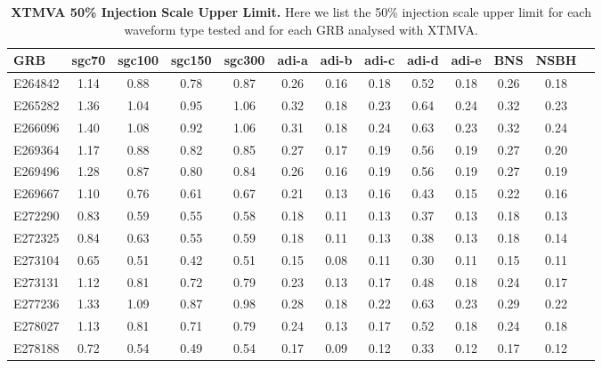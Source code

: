 \documentclass[11pt]{cuthesis}
\begin{document}
\begin{landscape}
\begin{table}
\centering
\begin{tabular}{l c  c  c  c  c  c  c  c c c c c |}
\hline
GRB & sgc70 &	sgc100 &	sgc150 &	sgc300 &	adi-a &	adi-b &	adi-c &	adi-d &	adi-e &	BNS &	NSBH \\
\hline		
E264842 & 1.14 & 0.88 & 0.78 & 0.87 & 0.26 & 0.16 & 0.18 & 0.52 & 0.18 & 0.26 & 0.18 \\                                                                         
E265282 & 1.36 & 1.04 & 0.95 & 1.06 & 0.32 & 0.18 & 0.23 & 0.64 & 0.24 & 0.32 & 0.23 \\									
E266096 & 1.40 & 1.08 & 0.92 & 1.06 & 0.31 & 0.18 & 0.24 & 0.63 & 0.23 & 0.32 & 0.24 \\
E269364 & 1.17 & 0.88 & 0.82 & 0.85 & 0.27 & 0.17 & 0.19 & 0.56 & 0.19 & 0.27 & 0.20 \\
E269496 & 1.28 & 0.87 & 0.80 & 0.84 & 0.26 & 0.16 & 0.19 & 0.56 & 0.19 & 0.27 & 0.19 \\
E269667 & 1.10 & 0.76 & 0.61 & 0.67 & 0.21 & 0.13 & 0.16 & 0.43 & 0.15 & 0.22 & 0.16 \\
E272290 & 0.83 & 0.59 & 0.55 & 0.58 & 0.18 & 0.11 & 0.13 & 0.37 & 0.13 & 0.18 & 0.13 \\
E272325 & 0.84 & 0.63 & 0.55 & 0.59 & 0.18 & 0.11 & 0.13 & 0.38 & 0.13 & 0.18 & 0.14 \\
E273104 & 0.65 & 0.51 & 0.42 & 0.51 & 0.15 & 0.08 & 0.11 & 0.30 & 0.11 & 0.15 & 0.11 \\
E273131 & 1.12 & 0.81 & 0.72 & 0.79 & 0.23 & 0.13 & 0.17 & 0.48 & 0.18 & 0.24 & 0.17 \\
E277236 & 1.33 & 1.09 & 0.87 & 0.98 & 0.28 & 0.18 & 0.22 & 0.63 & 0.23 & 0.29 & 0.22 \\
E278027 & 1.13 & 0.81 & 0.71 & 0.79 & 0.24 & 0.13 & 0.17 & 0.52 & 0.18 & 0.24 & 0.18 \\
E278188 & 0.72 & 0.54 & 0.49 & 0.54 & 0.17 & 0.09 & 0.12 & 0.33 & 0.12 & 0.17 & 0.12 \\
\end{tabular}
\caption{\textbf{XTMVA 50\% Injection Scale Upper Limit.} Here we list the 50\% injection scale upper limit for each waveform type tested and for each GRB analysed with XTMVA.}
 \label{tab:xtmva_sensitivity}
\end{table}
\end{landscape}
\end{document}
